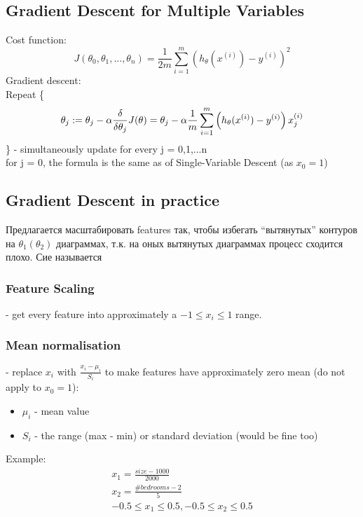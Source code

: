 \documentclass{scrartcl}
\begin{document}
\subsection {Gradient Descent for Multiple Variables}
Cost function:
\[
J(\theta_0, \theta_1, ..., \theta_n) = \frac{1}{2m}
\sum\limits_{i=1}^m\left(h_\theta(x^{(i)}) - y^{(i)} \right)^2
\]
Gradient descent: \\
Repeat \{
\[ \theta_j := \theta_j - \alpha \frac
{\delta}{\delta\theta_j}J(\theta) \\
= \theta_j - \alpha \frac{1}{m}
\sum\limits_{i=1}^m\left(h_\theta(x^{(i)}) - y^{(i)}
\right)x_j^{(i)} \]
\} - simultaneously update for every j = 0,1,...n \\
for j = 0, the formula is the same as of Single-Variable Descent (as
$x_0 = 1$)
\label {4-3}
\subsection {Gradient Descent in practice}
Предлагается масштабировать features так, чтобы избегать ``вытянутых''
контуров на $\theta_1(\theta_2)$ диаграммах, т.к. на оных вытянутых
диаграммах процесс сходится плохо. Сие называется

\subsubsection{ Feature Scaling} 
- get every feature into approximately a $-1 \leq x_i \leq 1$ range.
\subsubsection {Mean normalisation}
- replace $x_i$ with $\frac{x_i - \mu_i}{S_i}$ to make features have
approximately zero mean (do not apply to $x_0 = 1$):
\begin{itemize}
\item{$\mu_i$} - mean value
\item{$S_i$} - the range (max - min) or standard deviation (would be
  fine too)
\end{itemize}
Example:
\begin{equation*}
  \begin{split}
    x_1 = \frac{size-1000}{2000} \\
    x_2 = \frac{\#bedrooms-2}{5} \\
    -0.5 \leq x_1 \leq 0.5, -0.5 \leq x_2 \leq 0.5
  \end{split}
\end{equation*}
\end{document}

